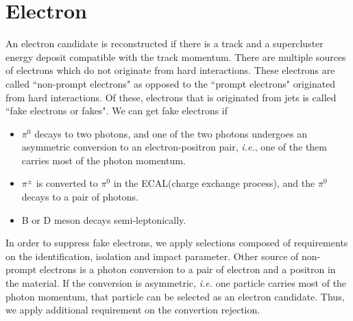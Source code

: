\section{ Electron }

An electron candidate is reconstructed if there is a track and a supercluster energy 
deposit compatible with the track momentum. There are multiple sources of 
electrons which do not originate from hard interactions. These electrons 
are called ``non-prompt electrons" as opposed to the 
``prompt electrons" originated from hard interactions. 
Of these, electrons that is originated from jets is called ``fake electrons or fakes".
We can get fake electrons if  
\begin{itemize}
\item $\pi^0$ decays to two photons, and one of the two photons
      undergoes an asymmetric conversion to an electron-positron pair, \textit{i.e.}, 
      one of the them carries most of the photon momentum. 
\item $\pi^\pm$ is converted to $\pi^0$ in the ECAL(charge exchange process), 
      and the $\pi^0$ decays to a pair of photons.
\item B or D meson decays semi-leptonically.  
\end{itemize}
In order to suppress fake electrons, we apply selections composed of 
requirements on the identification,
isolation and impact parameter.  
Other source of non-prompt electrons is a photon conversion 
to a pair of electron and a positron 
in the material. If the conversion is asymmetric, \textit{i.e.} one particle carries 
most of the photon momentum, that particle can be selected as an electron 
candidate. Thus, we apply additional requirement on the convertion rejection.


